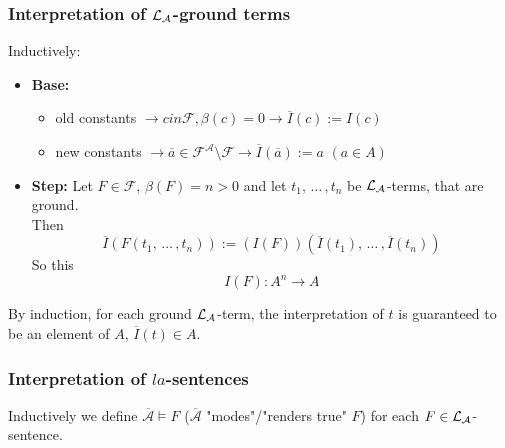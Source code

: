 
\subsubsection{Interpretation of $\mathcal{L}_\mathcal{A}$-ground terms}

Inductively:
\begin{itemize}
	\item \textbf{Base:} 
	\begin{itemize}
		\item old constants $\rightarrow c in \mathcal{F}, \beta(c) = 0 \rightarrow \overline I (c) := I(c)$ 
		\item new constants $\rightarrow \overline a \in \mathcal{F}^\mathcal{A} \setminus \mathcal{F} \rightarrow \overline I (\overline a) := a$ $(a \in A)$
	\end{itemize} \nn
	
	\item \textbf{Step:} Let $F \in \mathcal{F}$, $\beta (F) = n > 0$ and let $t_1, \, \dots \, , t_n$ be $\mathcal{L}_\mathcal{A}$-terms, that are ground.\\
	Then 
	$$\overline I (F(t_1, \, \dots \, , t_n)) := (I(F))(\overline I (t_1), \, \dots \, , \overline I (t_n)) $$
	So this 
	$$ I(F): A^n \rightarrow A $$
\end{itemize}

By induction, for each ground $\mathcal{L}_\mathcal{A}$-term, the interpretation of $t$ is guaranteed to be an element of $A$, $\overline I (t) \in A$.\\

\newpage

\subsubsection{Interpretation of $la$-sentences}

Inductively we define $\overline{\mathcal{A}} \models F$ ($\overline{\mathcal{A}}$ "modes"/"renders true" $F$) for each $F \in \mathcal{L}_\mathcal{A}$-sentence.\\

